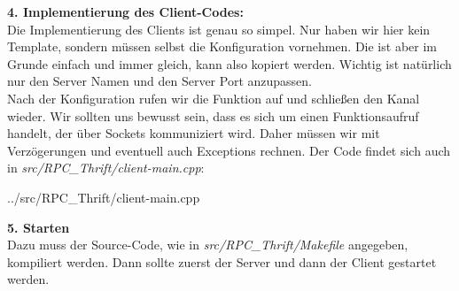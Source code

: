 \textbf{4. Implementierung des Client-Codes:}\\
Die Implementierung des Clients ist genau so simpel. Nur haben wir hier kein Template, sondern müssen selbst die Konfiguration vornehmen. Die ist aber im Grunde einfach und immer gleich, kann also kopiert werden. Wichtig ist natürlich nur den Server Namen und den Server Port anzupassen.\\
Nach der Konfiguration rufen wir die Funktion auf und schließen den Kanal wieder. Wir sollten uns bewusst sein, dass es sich um einen Funktionsaufruf handelt, der über Sockets kommuniziert wird. Daher müssen wir mit Verzögerungen und eventuell auch Exceptions rechnen. Der Code findet sich auch in \textit{src/RPC\_Thrift/client-main.cpp}:

\begin{lstinputlisting}[]
    {../src/RPC_Thrift/client-main.cpp}
\end{lstinputlisting}

\textbf{5. Starten}\\
Dazu muss der Source-Code, wie in \textit{src/RPC\_Thrift/Makefile} angegeben, kompiliert werden. Dann sollte zuerst der Server und dann der Client gestartet werden.
